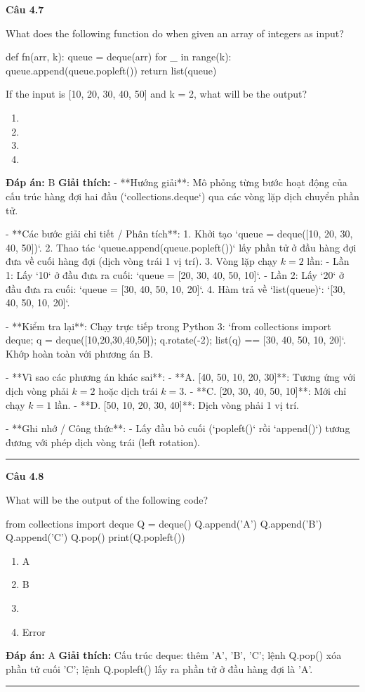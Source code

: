 \documentclass[11pt,a4paper]{article}
\newenvironment{question}[1]{%
  \par\vspace{1em}\noindent\textbf{\large Câu #1}\par\vspace{0.4em}
}{%
  \par\vspace{1em}\hrule\vspace{0.6em}
}
\newenvironment{choices}{%
  \begin{enumerate}[label=\textbf{\Alph*.},leftmargin=2.2em,itemsep=2pt,topsep=3pt]
}{%
  \end{enumerate}
}
\newcommand{\choice}{\item}
\newenvironment{codebox}{%
  \begin{tcolorbox}[colback=gray!8!white,colframe=gray!50!black,arc=1.5mm,boxrule=0.6pt,left=3mm,right=3mm,top=2.5mm,bottom=2.5mm]
  \ttfamily\small
}{%
  \end{tcolorbox}
}
\begin{document}
\begin{question}{4.7}
What does the following function do when given an array of integers as input?
\begin{codebox}
def fn(arr, k):
    queue = deque(arr)
    for _ in range(k):
        queue.append(queue.popleft())
    return list(queue)
\end{codebox}
If the input is [10, 20, 30, 40, 50] and k = 2, what will be the output?
\begin{choices}
\choice [40, 50, 10, 20, 30]
\choice [30, 40, 50, 10, 20]
\choice [20, 30, 40, 50, 10]
\choice [50, 10, 20, 30, 40]
\end{choices}
\textbf{Đáp án:} B
\textbf{Giải thích:} - **Hướng giải**:
  Mô phỏng từng bước hoạt động của cấu trúc hàng đợi hai đầu (`collections.deque`) qua các vòng lặp dịch chuyển phần tử.

- **Các bước giải chi tiết / Phân tích**:
  1. Khởi tạo `queue = deque([10, 20, 30, 40, 50])`.
  2. Thao tác `queue.append(queue.popleft())` lấy phần tử ở đầu hàng đợi đưa về cuối hàng đợi (dịch vòng trái 1 vị trí).
  3. Vòng lặp chạy \(k = 2\) lần:
     - Lần 1: Lấy `10` ở đầu đưa ra cuối: `queue = [20, 30, 40, 50, 10]`.
     - Lần 2: Lấy `20` ở đầu đưa ra cuối: `queue = [30, 40, 50, 10, 20]`.
  4. Hàm trả về `list(queue)`: `[30, 40, 50, 10, 20]`.

- **Kiểm tra lại**:
  Chạy trực tiếp trong Python 3:
  `from collections import deque; q = deque([10,20,30,40,50]); q.rotate(-2); list(q) == [30, 40, 50, 10, 20]`.
  Khớp hoàn toàn với phương án B.

- **Vì sao các phương án khác sai**:
  - **A. [40, 50, 10, 20, 30]**: Tương ứng với dịch vòng phải \(k = 2\) hoặc dịch trái \(k = 3\).
  - **C. [20, 30, 40, 50, 10]**: Mới chỉ chạy \(k = 1\) lần.
  - **D. [50, 10, 20, 30, 40]**: Dịch vòng phải 1 vị trí.

- **Ghi nhớ / Công thức**:
  - Lấy đầu bỏ cuối (`popleft()` rồi `append()`) tương đương với phép dịch vòng trái (left rotation).
\end{question}

\begin{question}{4.8}
What will be the output of the following code?
\begin{codebox}
from collections import deque
Q = deque()
Q.append('A')
Q.append('B')
Q.append('C')
Q.pop()
print(Q.popleft())
\end{codebox}
\begin{choices}
\choice A
\choice B
\choice [A, B, C]
\choice Error
\end{choices}
\textbf{Đáp án:} A
\textbf{Giải thích:} Cấu trúc deque: thêm 'A', 'B', 'C'; lệnh Q.pop() xóa phần tử cuối 'C'; lệnh Q.popleft() lấy ra phần tử ở đầu hàng đợi là 'A'.
\end{question}
\end{document}
